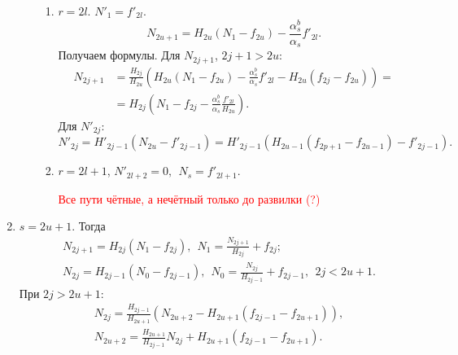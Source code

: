 \begin{enumerate}
\begin{enumerate}
        \begin{enumerate}
            \item \(r = 2l\). \(N'_1 = f'_{2l}\).
            \begin{equation*}
                N_{2u+1} = H_{2u} (N_1 - f_{2u}) - \frac{\alpha^b_s}{\alpha_s} f'_{2l}.
            \end{equation*}
            Получаем формулы. Для \(N_{2j+1}\), \(2j+1 > 2u\):
            \begin{equation*}
                \begin{split}
                    N_{2j+1} &= \frac{H_{2j}}{H_{2u}} \left( H_{2u} (N_1 - f_{2u}) - \frac{\alpha^b_s}{\alpha_s} f'_{2l} - H_{2u} (f_{2j} - f_{2u}) \right) = \\
                    & = H_{2j} \left( N_1 - f_{2j} - \frac{\alpha^b_s}{\alpha_s} \frac{ f'_{2l} }{H_{2u}} \right).
                \end{split}
            \end{equation*}
            Для \(N'_{2j}\):
            \begin{equation*}
                N'_{2j} = H'_{2j-1} (N_{2u} - f'_{2j-1}) = H'_{2j-1} \left( H_{2u-1} (f_{2p+1} - f_{2u-1}) - f'_{2j-1} \right).
            \end{equation*}

            \item \(r=2l+1\), \(N'_{2l+2} = 0, ~~ N_s = f'_{2l+1}\).
            
            \textcolor{red}{Все пути чётные, а нечётный только до развилки (?)}

        \end{enumerate} %

    \end{enumerate} %

    \item \(s = 2u+1\). Тогда 
    \begin{equation*}
        \begin{split}
            & N_{2j+1} = H_{2j} (N_1 - f_{2j}), ~~ N_1 = \frac{N_{2j+1}}{H_{2j}} + f_{2j}; \\
            & N_{2j} = H_{2j-1} (N_0 - f_{2j-1}), ~~ N_0 = \frac{N_{2j}}{H_{2j-1}} + f_{2j-1}, ~~ 2j < 2u+1.
        \end{split}
    \end{equation*}
    При \(2j > 2u+1\):
    \begin{equation*}
        \begin{split}
            & N_{2j} = \frac{H_{2j-1}}{H_{2u+1}} \left( N_{2u+2} - H_{2u+1} (f_{2j-1} - f_{2u+1}) \right),\\
            & N_{2u+2} = \frac{H_{2u+1}}{H_{2j-1}} N_{2j} + H_{2u+1} (f_{2j-1} - f_{2u+1}).
        \end{split}
    \end{equation*}


\end{enumerate}
